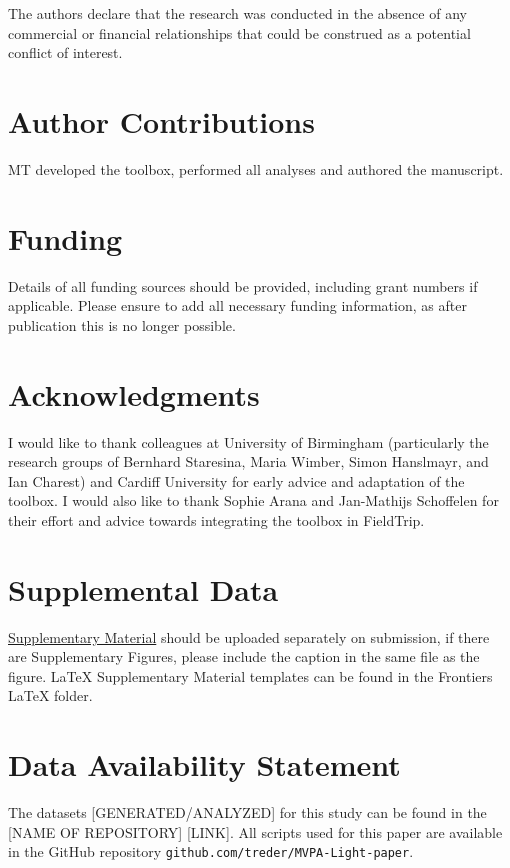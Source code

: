 \documentclass[utf8]{frontiersSCNS} %
\begin{document}
The authors declare that the research was conducted in the absence of any commercial or financial relationships that could be construed as a potential conflict of interest.

\section*{Author Contributions}

MT developed the toolbox, performed all analyses and authored the manuscript.

\section*{Funding}
Details of all funding sources should be provided, including grant numbers if applicable. Please ensure to add all necessary funding information, as after publication this is no longer possible.

\section*{Acknowledgments}
I would like to thank colleagues at University of Birmingham (particularly the research groups of Bernhard Staresina, Maria Wimber, Simon Hanslmayr, and Ian Charest) and Cardiff University for early advice and adaptation of the toolbox. 
I would also like to thank Sophie Arana and Jan-Mathijs Schoffelen for their effort and advice towards integrating the toolbox in FieldTrip.

\section*{Supplemental Data}
 \href{http://home.frontiersin.org/about/author-guidelines#SupplementaryMaterial}{Supplementary Material} should be uploaded separately on submission, if there are Supplementary Figures, please include the caption in the same file as the figure. LaTeX Supplementary Material templates can be found in the Frontiers LaTeX folder.

\section*{Data Availability Statement}
The datasets [GENERATED/ANALYZED] for this study can be found in the [NAME OF REPOSITORY] [LINK]. All scripts used for this paper are available in the GitHub repository \texttt{github.com/treder/MVPA-Light-paper}.
\end{document}
